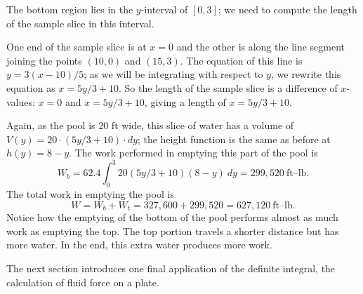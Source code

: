{The bottom region lies in the $y$-interval of $[0,3]$; we need to compute the length of the sample slice in this interval.

One end of the sample slice is at $x=0$ and the other is along the line segment joining the points $(10,0)$ and $(15,3)$. The equation of this line is $y= 3(x-10)/5$; as we will be integrating with respect to $y$, we rewrite this equation as $x=5y/3+10$. So the length of the sample slice is a difference of $x$-values: $x=0$ and $x=5y/3+10$, giving a length of $x=5y/3+10$. 

Again, as the pool is 20 ft wide, this slice of water has a volume of $V(y) = 20\cdot(5y/3+10)\cdot dy$; the height function is the same as before at $h(y)=8-y$. The work performed in emptying this part of the pool is
\[W_b = 62.4\int_0^3 20(5y/3+10)(8-y)\ dy = 299,520\ \text{ft--lb}.\]
The total work in emptying the pool is 
\[W = W_b+W_t = 327,600+299,520 = 627,120\ \text{ft--lb}.\]
Notice how the emptying of the bottom of the pool performs almost as much work as emptying the top. The top portion travels a shorter distance but has more water. In the end, this extra water produces more work.}

The next section introduces one final application of the definite integral, the calculation of fluid force on a plate.

